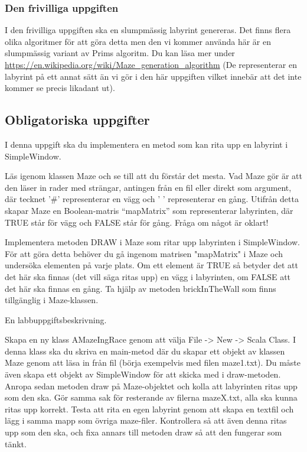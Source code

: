 \subsubsection{Den frivilliga uppgiften}
I den frivilliga uppgiften ska en slumpmässig labyrint genereras. Det finns flera olika algoritmer för att göra detta men den vi kommer använda här är en slumpmässig variant av Prims algoritm. Du kan läsa mer under \url{https://en.wikipedia.org/wiki/Maze\_generation\_algorithm} (De representerar en labyrint på ett annat sätt än vi gör i den här uppgiften vilket innebär att det inte kommer se precis likadant ut). 

\subsection{Obligatoriska uppgifter}

\Task I denna uppgift ska du implementera en metod som kan rita upp en labyrint i SimpleWindow.

\Subtask Läs igenom klassen Maze och se till att du förstår det mesta. Vad Maze gör är att den läser in rader med strängar, antingen från en fil eller direkt som argument, där tecknet '\#' representerar en vägg och ' ' representerar en gång. Utifrån detta skapar Maze en Boolean-matris ``mapMatrix'' som representerar labyrinten, där TRUE står för vägg och FALSE står för gång. Fråga om något är oklart!

\Subtask Implementera metoden DRAW i Maze som ritar upp labyrinten i SimpleWindow. För att göra detta behöver du gå ingenom matrisen "mapMatrix" i Maze och undersöka elementen på varje plats. Om ett element är TRUE så betyder det att det här ska finnas (det vill säga ritas upp) en vägg i labyrinten, om FALSE att det här ska finnas en gång. Ta hjälp av metoden brickInTheWall som finns tillgänglig i Maze-klassen.

\Task En labbuppgiftsbeskrivning.

\Subtask Skapa en ny klass AMazeIngRace genom att välja File -> New -> Scala Class. I denna klass ska du skriva en main-metod där du skapar ett objekt av klassen Maze genom att läsa in från fil (börja exempelvis med filen maze1.txt). Du måste även skapa ett objekt av SimpleWindow för att skicka med i draw-metoden. Anropa sedan metoden draw på Maze-objektet och kolla att labyrinten ritas upp som den ska. Gör samma sak för resterande av filerna mazeX.txt, alla ska kunna ritas upp korrekt. Testa att rita en egen labyrint genom att skapa en textfil och lägg i samma mapp som övriga maze-filer. Kontrollera så att även denna ritas upp som den ska, och fixa annars till metoden draw så att den fungerar som tänkt.

